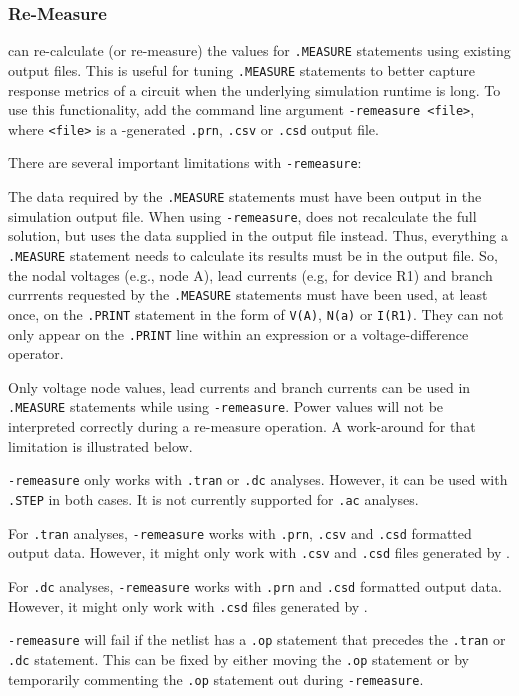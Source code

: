 \subsubsection{Re-Measure}
\label{Measure_ReMeasure}
\Xyce{} can re-calculate (or re-measure) the values for {\tt .MEASURE}
statements using existing \Xyce{} output files.  This is useful for 
tuning {\tt .MEASURE} statements to better capture response metrics of a circuit when 
the underlying simulation runtime is long.  To use this functionality, add the command 
line argument {\tt -remeasure <file>}, where {\tt <file>} is a \Xyce{}-generated 
{\tt .prn}, {\tt .csv} or {\tt .csd} output file.  

There are several important limitations with {\tt -remeasure}:
\begin{XyceItemize}
  \item The data required by the {\tt .MEASURE} statements must have been output 
  in the simulation output file.  When using {\tt -remeasure}, \Xyce{} does not 
  recalculate the full solution, but uses the data supplied in the output
  file instead.  Thus, everything a {\tt .MEASURE} statement needs to calculate its 
  results must be in the output file.  So, the nodal voltages (e.g., node A), lead
  currents (e.g, for device R1) and branch currrents requested by the {\tt .MEASURE} 
  statements must have been used, at least once, on the {\tt .PRINT} statement in the 
  form of {\tt V(A)}, {\tt N(a)} or {\tt I(R1)}.  They can not only appear on the 
  {\tt .PRINT} line within an expression or a voltage-difference operator.  
  \item Only voltage node values, lead currents and branch currents can be used in 
  {\tt .MEASURE} statements while using {\tt -remeasure}.  Power values will not be 
  interpreted correctly during a re-measure operation.  A work-around for that 
  limitation is illustrated below.
  \item {\tt -remeasure} only works with {\tt .tran} or {\tt .dc} analyses.  However, 
  it can be used with {\tt .STEP} in both cases. It is not currently supported for 
  {\tt .ac} analyses.
  \item For {\tt .tran} analyses, {\tt -remeasure} works with {\tt .prn}, {\tt .csv} and 
  {\tt .csd} formatted output data.  However, it might only work with {\tt .csv} and {\tt .csd} 
  files generated by \Xyce{}.
  \item For {\tt .dc} analyses, {\tt -remeasure} works with {\tt .prn} and {\tt .csd} 
  formatted output data.   However, it might only work with {\tt .csd}  files 
  generated by \Xyce{}.
  \item {\tt -remeasure} will fail if the netlist has a {\tt .op} statement that precedes
  the {\tt .tran} or {\tt .dc} statement.  This can be fixed by either moving the {\tt .op}
  statement or by temporarily commenting the {\tt .op} statement out during {\tt -remeasure}.
\end{XyceItemize}

